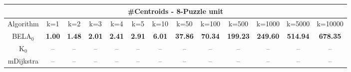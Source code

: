 \begin{tabular}{c|cccccccccccc}\toprule
\multicolumn{13}{c}{#Centroids - 8-Puzzle unit}\\ \midrule
Algorithm & k=1 & k=2 & k=3 & k=4 & k=5 & k=10 & k=50 & k=100 & k=500 & k=1000 & k=5000 & k=10000 \\ \midrule
BELA$_0$ & \textbf{1.00} & \textbf{1.48} & \textbf{2.01} & \textbf{2.41} & \textbf{2.91} & \textbf{6.01} & \textbf{37.86} & \textbf{70.34} & \textbf{199.23} & \textbf{249.60} & \textbf{514.94} & \textbf{678.35} \\
K$_0$ & -- & -- & -- & -- & -- & -- & -- & -- & -- & -- & -- & -- \\
mDijkstra & -- & -- & -- & -- & -- & -- & -- & -- & -- & -- & -- & -- \\ \bottomrule 
\end{tabular}
